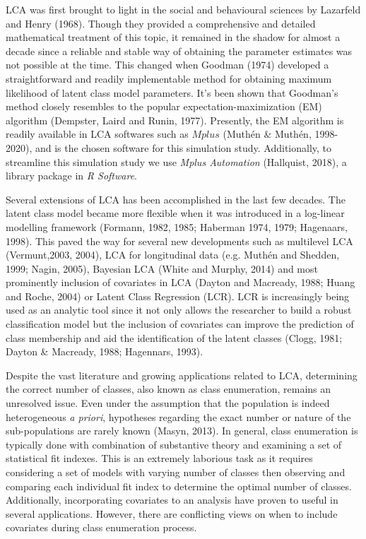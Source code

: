 LCA was first brought to light in the social and behavioural sciences by Lazarfeld and Henry (1968). Though they provided a comprehensive and detailed mathematical treatment of this topic, it remained in the shadow for almost a decade since a reliable and stable way of obtaining the parameter estimates was not possible at the time. This changed when Goodman (1974) developed a straightforward and readily implementable method for obtaining maximum likelihood of latent class model parameters. It's been shown that Goodman's method closely resembles to the popular expectation-maximization (EM) algorithm (Dempster, Laird and Runin, 1977). Presently, the EM algorithm is readily available in LCA softwares such as $Mplus$ (Muth\'en \& Muth\'en, 1998-2020), and is the chosen software for this simulation study. Additionally, to streamline this simulation study we use \textit{Mplus Automation} (Hallquist, 2018), a library package in \textit{R Software}.

Several extensions of LCA has been accomplished in the last few decades. The latent class model became more flexible when it was introduced in a log-linear modelling framework (Formann, 1982, 1985; Haberman 1974, 1979; Hagenaars, 1998). This paved the way  for several new developments such as multilevel LCA (Vermunt,2003, 2004), LCA for longitudinal data (e.g. Muth\'en and Shedden, 1999; Nagin, 2005), Bayesian LCA (White and Murphy, 2014) and most prominently inclusion of covariates in LCA (Dayton and Macready, 1988; Huang and Roche, 2004) or Latent Class Regression (LCR). LCR is increasingly being used as an analytic tool since it not only allows the researcher to build a robust classification model but the inclusion of covariates can improve the prediction of class membership and aid the identification of the latent classes (Clogg, 1981; Dayton & Macready, 1988; Hagennars, 1993). 

Despite the vast literature and growing applications related to LCA, determining the correct number of classes, also known as class enumeration, remains an unresolved issue. Even under the assumption that the population is indeed heterogeneous \textit{a priori}, hypotheses regarding the exact number or nature of the sub-populations are rarely known (Masyn, 2013). In general, class enumeration is typically done with combination of substantive theory and examining a set of statistical fit indexes. This is an extremely laborious task as it requires considering a set of models with varying number of classes then observing and comparing each individual fit index to determine the optimal number of classes. Additionally, incorporating covariates to an analysis have proven to useful in several applications. However, there are conflicting views on when to include covariates during class enumeration process. 

